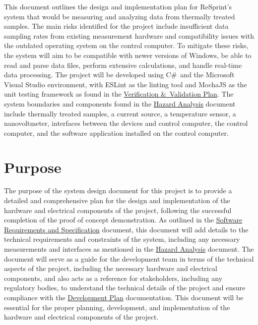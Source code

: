\documentclass[12pt, titlepage]{article}
\begin{document}
\noindent This document outlines the design and implementation plan for ReSprint's system that would be measuring and analyzing data from thermally treated samples. The main risks identified for the project include insufficient data sampling rates from existing measurement hardware and compatibility issues with the outdated operating system on the control computer. To mitigate these risks, the system will aim to be compatible with newer versions of Windows, be able to read and parse data files, perform extensive calculations, and handle real-time data processing. The project will be developed using C\#\ and the Microsoft Visual Studio environment, with ESLint as the linting tool and MochaJS as the unit testing framework as found in the \href{https://github.com/edwin-do/capstoneTeam30/blob/main/docs/VnVPlan/VnVPlan.pdf}{Verification \&\ Validation Plan}. The system boundaries and components found in the \href{https://github.com/edwin-do/capstoneTeam30/docs/HazardAnalysis/HazardAnalysis.pdf}{Hazard Analysis} document include thermally treated samples, a current source, a temperature sensor, a nanovoltmeter, interfaces between the devices and control computer, the control computer, and the software application installed on the control computer. \\

\section{Purpose}



\noindent The purpose of the system design document for this project is to provide a detailed and comprehensive plan for the design and implementation of the hardware and electrical components of the project, following the successful completion of the proof of concept demonstration. As outlined in the \href{https://github.com/edwin-do/capstoneTeam30/blob/main/docs/SRS/SRS.pdf}{Software Requirements and Specification} document, this document will add details to the technical requirements and constraints of the system, including any necessary measurements and interfaces as mentioned in the \href{https://github.com/edwin-do/capstoneTeam30/blob/main/docs/HazardAnalysis/HazardAnalysis.pdf}{Hazard Analysis} document. The document will serve as a guide for the development team in terms of the technical aspects of the project, including the necessary hardware and electrical components, and also acts as a reference for stakeholders, including any regulatory bodies, to understand the technical details of the project and ensure compliance with the \href{https://github.com/edwin-do/capstoneTeam30/blob/main/docs/DevelopmentPlan/DevelopmentPlan.pdf}{Development Plan} documentation. This document will be essential for the proper planning, development, and implementation of the hardware and electrical components of the project. \\
\end{document}
